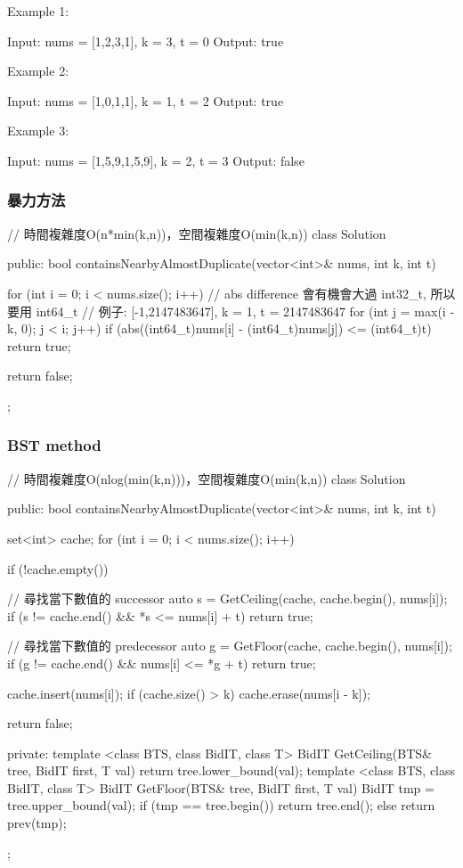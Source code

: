 Example 1:
\begin{Code}
Input: nums = [1,2,3,1], k = 3, t = 0
Output: true
\end{Code}

Example 2:
\begin{Code}
Input: nums = [1,0,1,1], k = 1, t = 2
Output: true
\end{Code}

Example 3:
\begin{Code}
Input: nums = [1,5,9,1,5,9], k = 2, t = 3
Output: false
\end{Code}

\subsubsection{暴力方法}
\begin{Code}
// 時間複雜度O(n*min(k,n))，空間複雜度O(min(k,n))
class Solution {
public:
    bool containsNearbyAlmostDuplicate(vector<int>& nums, int k, int t) {
        for (int i = 0; i < nums.size(); i++)
        {
            // abs difference 會有機會大過 int32_t, 所以要用 int64_t
            // 例子: [-1,2147483647], k = 1, t = 2147483647
            for (int j = max(i - k, 0); j < i; j++)
                if (abs((int64_t)nums[i] - (int64_t)nums[j]) <= (int64_t)t) return true;
        }

        return false;
    }
};
\end{Code}

\subsubsection{BST method}
\begin{Code}
// 時間複雜度O(nlog(min(k,n)))，空間複雜度O(min(k,n))
class Solution {
public:
    bool containsNearbyAlmostDuplicate(vector<int>& nums, int k, int t) {
        set<int> cache;
        for (int i = 0; i < nums.size(); i++)
        {
            if (!cache.empty())
            {
                // 尋找當下數值的 successor
                auto s = GetCeiling(cache, cache.begin(), nums[i]);
                if (s != cache.end() && *s <= nums[i] + t) return true;

                // 尋找當下數值的 predecessor
                auto g = GetFloor(cache, cache.begin(), nums[i]);
                if (g != cache.end() && nums[i] <= *g + t) return true;
            }

            cache.insert(nums[i]);
            if (cache.size() > k)
                cache.erase(nums[i - k]);
        }
        return false;
    }
private:
    template <class BTS, class BidIT, class T>
        BidIT GetCeiling(BTS& tree, BidIT first, T val)
    {
        return tree.lower_bound(val);
    }
    template <class BTS, class BidIT, class T>
        BidIT GetFloor(BTS& tree, BidIT first, T val)
    {
        BidIT tmp = tree.upper_bound(val);
        if (tmp == tree.begin())
            return tree.end();
        else
            return prev(tmp);
    }
};
\end{Code}

